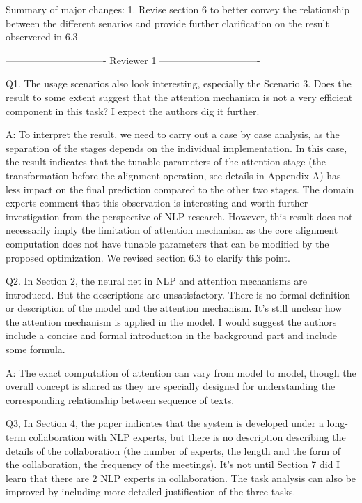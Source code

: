 Summary of major changes:
1. Revise section 6 to better convey the relationship between the different senarios and provide further clarification on the result observered in 6.3


------------------------------- Reviewer 1 -------------------------------


Q1. The usage scenarios also look interesting, especially the Scenario 3. Does the result to some extent suggest that the attention mechanism is not a very efficient component in this task? I expect the authors dig it further.

A: To interpret the result, we need to carry out a case by case analysis, as the separation of the stages depends on the individual implementation. In this case, the result indicates that the tunable parameters of the attention stage (the transformation before the alignment operation, see details in Appendix A) has less impact on the final prediction compared to the other two stages. The domain experts comment that this observation is interesting and worth further investigation from the perspective of NLP research. However, this result does not necessarily imply the limitation of attention mechanism as the core alignment computation does not have tunable parameters that can be modified by the proposed optimization. We revised section 6.3 to clarify this point.


Q2. In Section 2, the neural net in NLP and attention mechanisms are introduced. But the descriptions are unsatisfactory. There is no formal definition or description of the model and the attention mechanism. It's still unclear how the attention mechanism is applied in the model. I would suggest the authors include a concise and formal introduction in the background part and include some formula.

A: The exact computation of attention can vary from model to model, though the overall concept is shared as they are specially designed for understanding the corresponding relationship between sequence of texts.

Q3, In Section 4, the paper indicates that the system is developed under a long-term collaboration with NLP experts, but there is no description describing the details of the collaboration (the number of experts, the length and the form of the collaboration, the frequency of the meetings). It's not until Section 7 did I learn that there are 2 NLP experts in collaboration. The task analysis can also be improved by including more detailed justification of the three tasks.

